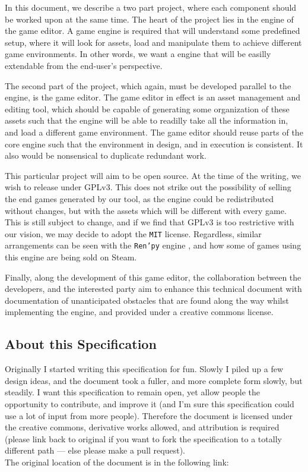 In this document, we describe a two part project, where each component should be
worked upon at the same time. The heart of the project lies in the engine of the
game editor. A game engine is required that will understand some predefined
setup, where it will look for assets, load and manipulate them to achieve
different game environments. In other words, we want a engine that will be
easilly extendable from the end-user's perspective.

The second part of the project, which again, must be developed parallel to the
engine, is the game editor. The game editor in effect is an asset management
and editing tool, which should be capable of generating some organization of
these assets such that the engine will be able to readilly take all the
information in, and load a different game environment. The game editor should
reuse parts of the core engine such that the environment in design, and in
execution is consistent. It also would be nonsensical to duplicate redundant
work.

This particular project will aim to be open source. At the time of the writing,
we wish to release under GPLv3. This does not strike out the possibility of
selling the end games generated by our tool, as the engine could be
redistributed without changes, but with the assets which will be different with
every game. This is still subject to change, and if we find that GPLv3 is too
restrictive with our vision, we may decide to adopt the \texttt{MIT} license.
Regardless, similar arrangements can be seen with the \texttt{Ren'py} engine
\cite{renpy}, and how some of games using this engine are being sold on Steam.

Finally, along the development of this game editor, the collaboration between
the developers, and the interested party aim to enhance this technical document
with documentation of unanticipated obstacles that are found along the way
whilst implementing the engine, and provided under a creative commons license.

\subsection{About this Specification}

Originally I started writing this specification for fun. Slowly I piled up a few
design ideas, and the document took a fuller, and more complete form slowly, but
steadily. I want this specification to remain open, yet allow people the
opportunity to contribute, and improve it (and I'm sure this specification could
use a lot of input from more people). Therefore the document is licensed under
the creative commons, derivative works allowed, and attribution is required
(please link back to original if you want to fork the specification to a totally
different path --- else please make a pull request).
\\[0.2in]
\noindent The original location of the document is in the following link:

